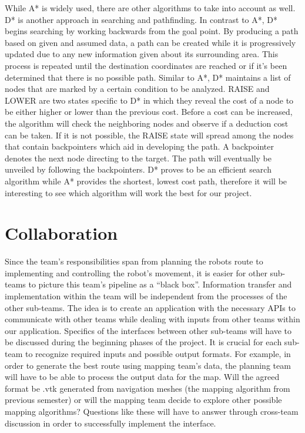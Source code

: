 \documentclass[titlepage]{article}
\begin{document}
While A* is widely used, there are other algorithms to take into account as well. D* is another approach in searching and pathfinding. In contrast to A*, D* begins searching by working backwards from the goal point. By producing a path based on given and assumed data, a path can be created while it is progressively updated due to any new information given about its surrounding area. This process is repeated until the destination coordinates are reached or if it’s been determined that there is no possible path. Similar to A*, D* maintains a list of nodes that are marked by a certain condition to be analyzed. RAISE and LOWER are two states specific to D* in which they reveal the cost of a node to be either higher or lower than the previous cost. Before a cost can be increased, the algorithm will check the neighboring nodes and observe if a deduction cost can be taken. If it is not possible, the RAISE state will spread among the nodes that contain backpointers which aid in developing the path. A backpointer denotes the next node directing to the target. The path will eventually be unveiled by following the backpointers. D* proves to be an efficient search algorithm while A* provides the shortest, lowest cost path, therefore it will be interesting to see which algorithm will work the best for our project.
\section{Collaboration}
Since the team’s responsibilities span from planning the robots route to implementing and controlling the robot’s movement, it is easier for other sub-teams to picture this team’s pipeline as a “black box”. Information transfer and implementation within the team will be independent from the processes of the other sub-teams. The idea is to create an application with the necessary APIs to communicate with other teams while dealing with inputs from other teams within our application. Specifics of the interfaces between other sub-teams will have to be discussed during the beginning phases of the project. It is crucial for each sub-team to recognize required inputs and possible output formats. For example, in order to generate the best route using mapping team’s data, the planning team will have to be able to process the output data for the map. Will the agreed format be .vtk generated from navigation meshes (the mapping algorithm from previous semester) or will the mapping team decide to explore other possible mapping algorithms? Questions like these will have to answer through cross-team discussion in order to successfully implement the interface.
\end{document}
